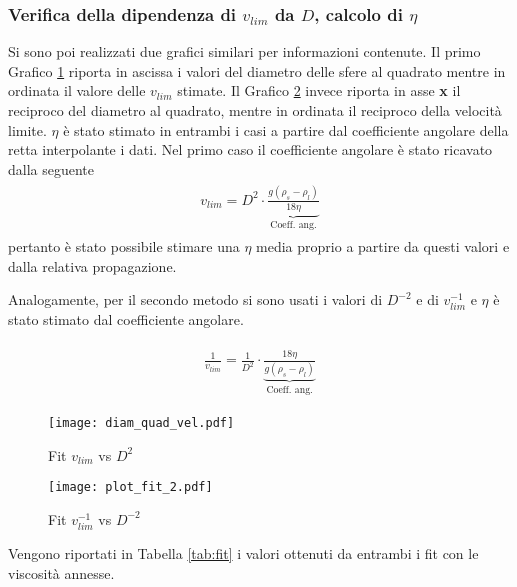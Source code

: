 \documentclass[a4paper,11pt,oneside]{article}
\begin{document}
\subsubsection*{Verifica della dipendenza di $v_{lim}$ da $D$, calcolo di $\eta$}
Si sono poi realizzati due grafici similari per informazioni contenute. Il primo Grafico \ref{fig:verifica_legge_1} riporta in ascissa i valori del diametro delle sfere al quadrato mentre in ordinata il valore delle $v_{lim}$ stimate. Il Grafico \ref{fig:verifica_legge_2} invece riporta in asse \textbf{x} il reciproco del diametro al quadrato, mentre in ordinata il reciproco della velocità limite. $\eta$ è stato stimato in entrambi i casi a partire dal coefficiente angolare della retta interpolante i dati.\newline
Nel primo caso il coefficiente angolare è stato ricavato dalla seguente
\begin{align*}
\begin{split}
    v_{lim}=D^{2} \cdot \underbrace{\frac{g (\rho_s - \rho_l)}{18 \eta}}_\text{Coeff. ang.}
\end{split}
\end{align*}
pertanto è stato possibile stimare una $\eta$ media proprio a partire da questi valori e dalla relativa propagazione.

Analogamente, per il secondo metodo si sono usati i valori di $D^{-2}$ e di $v_{lim}^{-1}$ e $\eta$ è stato stimato dal coefficiente angolare.

\begin{align*}
\begin{split}
     \frac{1}{v_{lim}}= \frac{1}{D^{2}} \cdot \underbrace{\frac{18 \eta}{g (\rho_s - \rho_l)}}_\text{Coeff. ang.}
\end{split}
\end{align*}

\begin{figure}
    \centering
    \texttt{[image: diam\_quad\_vel.pdf]}
    \caption{Fit $v_{lim}$ vs $D^{2}$}
    \label{fig:verifica_legge_1}
\end{figure}

\begin{figure}
    \centering
    \texttt{[image: plot\_fit\_2.pdf]}
    \caption{Fit $v_{lim}^{-1}$ vs $D^{-2}$}
    \label{fig:verifica_legge_2}
\end{figure}

Vengono riportati in Tabella \ref{tab:fit} i valori ottenuti da entrambi i fit con le viscosità annesse.
\end{document}
